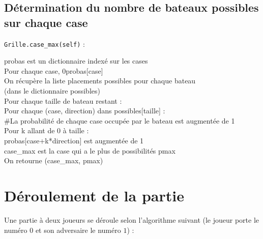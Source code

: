 \newpage


\subsection{Détermination du nombre de bateaux possibles sur chaque case}\label{case_max}
\texttt{Grille.case\_max(self)} :
\begin{algo1}
probas est un dictionnaire indexé sur les cases\\
Pour chaque case, 0\sto probas[case]\\
On récupère la liste placements possibles pour chaque bateau\\
 (dans le dictionnaire possibles)\\
Pour chaque taille de bateau restant :\\
Pour chaque (case, direction) dans possibles[taille] :\\
\#La probabilité de chaque case occupée par le bateau est augmentée de 1\\
Pour k allant de 0 à taille :\\
probas[case+k*direction] est augmentée de 1\\
case\_max est la case qui a le plus de possibilités pmax\\
On retourne (case\_max, pmax)\\
\end{algo1}


\section{Déroulement de la partie}

Une partie à deux joueurs se déroule selon l'algorithme suivant (le joueur porte le numéro $0$ et son adversaire le numéro $1$) :

